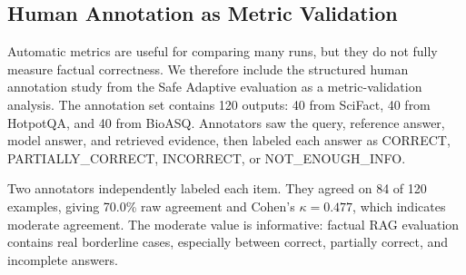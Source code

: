 \documentclass[11pt]{article}
\begin{document}
\subsection{Human Annotation as Metric Validation}
\label{sec:human-annotation}

Automatic metrics are useful for comparing many runs, but they do not fully measure factual correctness. We therefore include the structured human annotation study from the Safe Adaptive evaluation as a metric-validation analysis. The annotation set contains 120 outputs: 40 from SciFact, 40 from HotpotQA, and 40 from BioASQ. Annotators saw the query, reference answer, model answer, and retrieved evidence, then labeled each answer as CORRECT, PARTIALLY\_CORRECT, INCORRECT, or NOT\_ENOUGH\_INFO.

Two annotators independently labeled each item. They agreed on 84 of 120 examples, giving 70.0\% raw agreement and Cohen's $\kappa = 0.477$, which indicates moderate agreement. The moderate value is informative: factual RAG evaluation contains real borderline cases, especially between correct, partially correct, and incomplete answers.

\begin{table}[t]
\centering
\small
\caption{Human labels for agreed annotation examples only.}
\label{tab:annotation_agreed}
\end{table}

\begin{table}[t]
\centering
\small
\caption{Alignment between automatic metric buckets and agreed human labels.}
\label{tab:metric_alignment}
\end{table}
\end{document}
